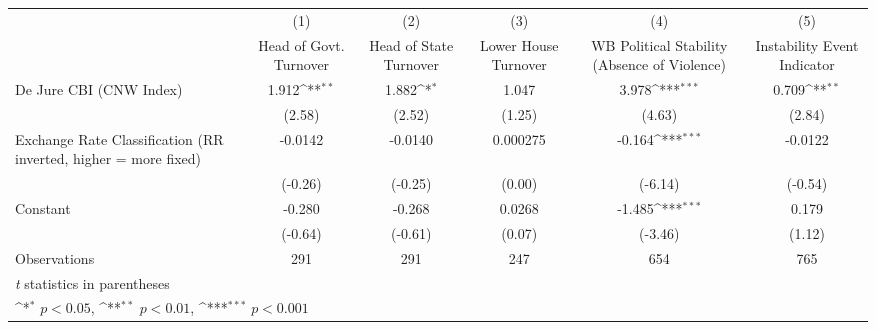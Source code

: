 {
\def\sym#1{\ifmmode^{#1}\else\(^{#1}\)\fi}
\begin{tabular}{l*{5}{c}}
\hline\hline
                &\multicolumn{1}{c}{(1)}&\multicolumn{1}{c}{(2)}&\multicolumn{1}{c}{(3)}&\multicolumn{1}{c}{(4)}&\multicolumn{1}{c}{(5)}\\
                &\multicolumn{1}{c}{Head of Govt. Turnover}&\multicolumn{1}{c}{Head of State Turnover}&\multicolumn{1}{c}{Lower House Turnover}&\multicolumn{1}{c}{WB Political Stability (Absence of Violence)}&\multicolumn{1}{c}{Instability Event Indicator}\\
\hline
De Jure CBI (CNW Index)&    1.912\sym{**} &    1.882\sym{*}  &    1.047         &    3.978\sym{***}&    0.709\sym{**} \\
                &   (2.58)         &   (2.52)         &   (1.25)         &   (4.63)         &   (2.84)         \\
[1em]
Exchange Rate Classification (RR inverted, higher = more fixed)&  -0.0142         &  -0.0140         & 0.000275         &   -0.164\sym{***}&  -0.0122         \\
                &  (-0.26)         &  (-0.25)         &   (0.00)         &  (-6.14)         &  (-0.54)         \\
[1em]
Constant        &   -0.280         &   -0.268         &   0.0268         &   -1.485\sym{***}&    0.179         \\
                &  (-0.64)         &  (-0.61)         &   (0.07)         &  (-3.46)         &   (1.12)         \\
\hline
Observations    &      291         &      291         &      247         &      654         &      765         \\
\hline\hline
\multicolumn{6}{l}{\footnotesize \textit{t} statistics in parentheses}\\
\multicolumn{6}{l}{\footnotesize \sym{*} \(p<0.05\), \sym{**} \(p<0.01\), \sym{***} \(p<0.001\)}\\
\end{tabular}
}
